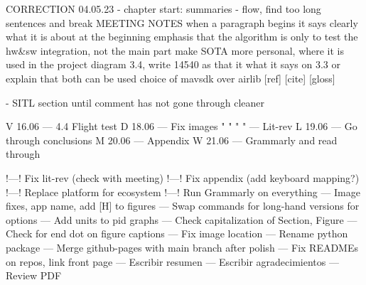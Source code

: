 CORRECTION 04.05.23
 - chapter start: summaries
 - flow, find too long sentences and break
 MEETING NOTES
when a paragraph begins it says clearly what it is about at the beginning
emphasis that the algorithm is only to test the hw&sw integration, not the main part
make SOTA more personal, where it is used in the project
diagram 3.4, write 14540 as that it what it says on 3.3 or explain that both can be used
choice of mavsdk over airlib
[ref] [cite] [gloss]

- SITL section until comment has not gone through cleaner

 

V 16.06 --- 4.4 Flight test
D 18.06 --- Fix images
" " " " --- Lit-rev
L 19.06 --- Go through conclusions
M 20.06 --- Appendix
W 21.06 --- Grammarly and read through

        !---! Fix lit-rev (check with meeting)
        !---! Fix appendix (add keyboard mapping?)
        !---! Replace platform for ecosystem
        !---! Run Grammarly on everything
        --- Image fixes, app name, add [H] to figures
        --- Swap commands for long-hand versions for options
        --- Add units to pid graphs
        --- Check capitalization of Section, Figure
        --- Check for end dot on figure captions
        --- Fix image location
        --- Rename python package
        --- Merge github-pages with main branch after polish
        --- Fix READMEs on repos, link front page
        --- Escribir resumen
        --- Escribir agradecimientos
        --- Review PDF